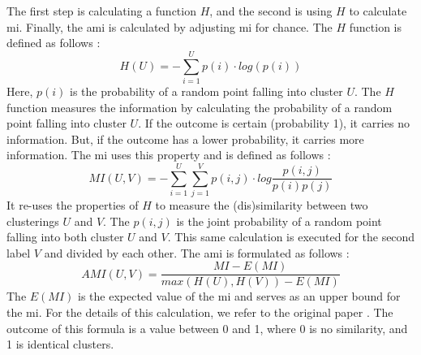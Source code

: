 \begin{enumerate}
{\begin{equation}
          \end{equation}
          }
          The first step is calculating a function $H$, and the second is using $H$ to calculate \gls{mi}.
          Finally, the \gls{ami} is calculated by adjusting \gls{mi} for chance. \newline
          The $H$ function is defined as follows \citep{vinh_information_nodate}:
          \begin{equation}
              H(U) = - \sum_{i=1}^{U} p(i) \cdot log (p(i))
          \end{equation}
          Here, $p(i)$ is the probability of a random point falling into cluster $U$.
          The $H$ function measures the information by calculating the probability of a random point falling into cluster $U$.
          If the outcome is certain (probability 1), it carries no information.
          But, if the outcome has a lower probability, it carries more information.
          The \gls{mi} uses this property and is defined as follows \citep{vinh_information_nodate}:
          \begin{equation}
              MI(U, V) = - \sum_{i=1}^{U} \sum_{j=1}^{V} p(i,j) \cdot log \frac{p(i,j)}{p(i)p(j)}
          \end{equation}
          It re-uses the properties of $H$ to measure the (dis)similarity between two clusterings $U$ and $V$.
          The $p(i,j)$ is the joint probability of a random point falling into both cluster $U$ and $V$.
          This same calculation is executed for the second label $V$ and divided by each other.
          The \gls{ami} is formulated as follows \citep{vinh_information_nodate}:
          \begin{equation}
              AMI (U, V)  = \frac{MI - E(MI)}{max(H(U), H(V)) - E(MI)}
          \end{equation}
          The $E(MI)$ is the expected value of the \gls{mi} and serves as an upper bound for the \gls{mi}.
          For the details of this calculation, we refer to the original paper \citep{vinh_information_nodate}.
          The outcome of this formula is a value between 0 and 1, where 0 is no similarity, and 1 is identical clusters.
\end{enumerate}
